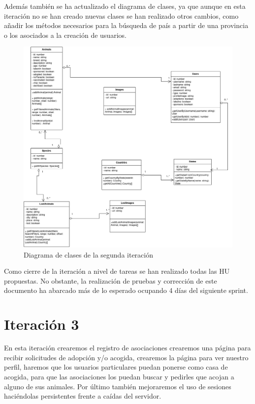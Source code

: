 Además también se ha actualizado el diagrama de clases, ya que aunque en esta iteración no se han creado nuevas clases se han realizado otros cambios, como añadir los métodos necesarios para la búsqueda de país a partir de una provincia o los asociados a la creación de usuarios.

\begin{figure}[H]
	\centering
	\includegraphics[width=1\linewidth]{"sprint 2/clases"}
	\caption{Diagrama de clases de la segunda iteración}
	\label{fig:clases2}
\end{figure}


Como cierre de la iteración a nivel de tareas se han realizado todas las HU propuestas. No obstante, la realización de pruebas y corrección de este documento ha abarcado más de lo esperado ocupando 4 días del siguiente sprint.

\section{Iteración 3}
En esta iteración crearemos el registro de asociaciones crearemos una página para recibir solicitudes de adopción y/o acogida, crearemos la página para ver nuestro perfil, haremos que los usuarios particulares puedan ponerse como casa de acogida, para que las asociaciones los puedan buscar y pedirles que acojan a alguno de sus animales. Por último también mejoraremos el uso de sesiones haciéndolas persistentes frente a caídas del servidor. \\
